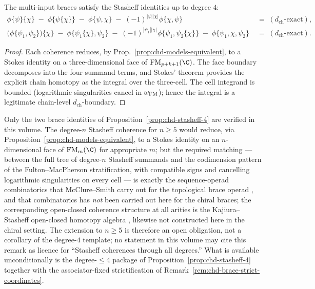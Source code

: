 \begin{proposition}%
\label{prop:chd-stasheff-4}%
%
The multi-input braces satisfy the Stasheff identities up to degree $4$:
\begin{align}
 \phi\{\psi\}\{\chi\} \;-\; \phi\{\psi\{\chi\}\} \;-\;
 \phi\{\psi,\chi\} \;-\; (-1)^{|\psi||\chi|}\phi\{\chi,\psi\}
 \;&=\; (d_{\mathrm{ch}}\text{-exact}), \\
 \bigl(\phi\{\psi_1,\psi_2\}\bigr)\{\chi\} \;-\;
 \phi\{\psi_1\{\chi\},\psi_2\} \;-\;
 (-1)^{|\psi_1||\chi|} \phi\{\psi_1,\psi_2\{\chi\}\}
 \;-\; \phi\{\psi_1,\chi,\psi_2\} \;&=\; (d_{\mathrm{ch}}\text{-exact}).
\end{align}
\end{proposition}

\begin{proof}
Each coherence reduces, by Prop.~\ref{prop:chd-models-equivalent}, to
a Stokes identity on a three-dimensional face of
$\FM_{p+k+1}(\C)$. The face boundary decomposes into the four summand
terms, and Stokes' theorem provides the explicit chain homotopy as
the integral over the three-cell. The cell integrand is bounded
(logarithmic singularities cancel in $\omega_{\mathrm{FM}}$); hence the
integral is a legitimate chain-level $d_{\mathrm{ch}}$-boundary.
\end{proof}

\begin{remark}%
\label{rem:chd-stasheff-higher-degree}%
%
Only the two brace identities of
Proposition~\ref{prop:chd-stasheff-4} are verified in this volume.
The degree-$n$ Stasheff coherence for $n \ge 5$ would reduce, via
Proposition~\ref{prop:chd-models-equivalent}, to a Stokes identity on
an $n$-dimensional face of $\FM_{m}(\C)$ for appropriate $m$; but the
required matching --- between the full tree of degree-$n$ Stasheff
summands and the codimension pattern of the Fulton--MacPherson
stratification, with compatible signs and cancelling logarithmic
singularities on every cell --- is exactly the sequence-operad
combinatorics that McClure--Smith carry out for the topological brace
operad \cite{McClureSmith02}, and that combinatorics has \emph{not}
been carried out here for the chiral braces; the corresponding
open-closed coherence structure at all arities is the
Kajiura--Stasheff open-closed homotopy algebra
\cite{KajiuraStasheff06}, likewise not constructed here in the
chiral setting. The extension to $n \ge 5$ is therefore an
open obligation, not a corollary of the degree-$4$ template; no
statement in this volume may cite this remark as licence for
``Stasheff coherences through all degrees.'' What is available
unconditionally is the degree-$\le 4$ package of
Proposition~\ref{prop:chd-stasheff-4} together with the
associator-fixed strictification of
Remark~\ref{rem:chd-brace-strict-coordinates}.
\end{remark}

